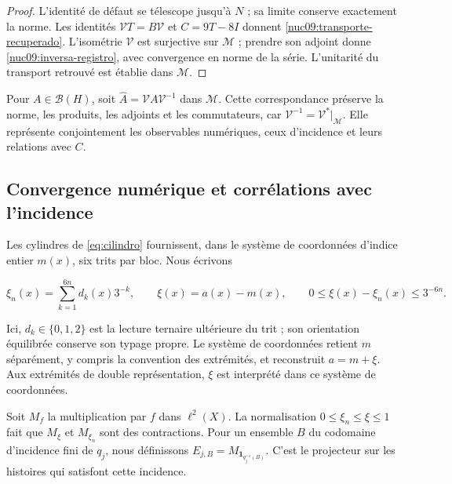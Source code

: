 \begin{proof}
L’identité de défaut se télescope jusqu’à \(N\) ; sa limite conserve
exactement la norme. Les identités
\(\mathcal VT=B\mathcal V\) et \(C=9T-8I\) donnent
\eqref{nuc09:transporte-recuperado}.
L’isométrie \(\mathcal V\) est surjective sur \(\mathcal M\) ;
prendre son adjoint donne \eqref{nuc09:inversa-registro}, avec convergence
en norme de la série. L’unitarité du transport retrouvé
est établie dans \(\mathcal M\).
\end{proof}

Pour \(A\in\mathcal B(H)\), soit
\(\widehat A=\mathcal VA\mathcal V^{-1}\) dans \(\mathcal M\).
Cette correspondance préserve la norme, les produits, les adjoints et les commutateurs,
car \(\mathcal V^{-1}=\mathcal V^*|_{\mathcal M}\).
Elle représente conjointement les observables numériques, ceux d’incidence
et leurs relations avec \(C\).

\subsection{Convergence numérique et corrélations avec l’incidence
}

Les cylindres de \eqref{eq:cilindro} fournissent, dans le système de coordonnées
d’indice entier \(m(x)\), six trits par bloc. Nous écrivons



\[
\xi_n(x)=\sum_{k=1}^{6n}d_k(x)3^{-k},\qquad
\xi(x)=a(x)-m(x),\qquad 0\le\xi(x)-\xi_n(x)\le3^{-6n}.
\]



Ici, \(d_k\in\{0,1,2\}\) est la lecture ternaire ultérieure du trit ;
son orientation équilibrée conserve son typage propre. Le système de coordonnées
retient \(m\) séparément, y compris la convention des extrémités,
et reconstruit \(a=m+\xi\). Aux extrémités de double représentation,
\(\xi\) est interprété dans ce système de coordonnées.

Soit \(M_f\) la multiplication par \(f\) dans \(\ell^2(X)\).
La normalisation \(0\le\xi_n\le\xi\le1\) fait que
\(M_\xi\) et \(M_{\xi_n}\) sont des contractions.
Pour un ensemble \(B\) du codomaine d’incidence fini de \(q_j\),
nous définissons
\(E_{j,B}=M_{\mathbf1_{q_j^{-1}(B)}}\).
C’est le projecteur sur les histoires qui satisfont cette incidence.

